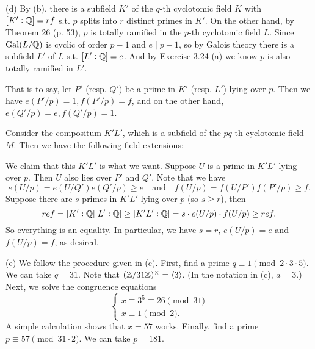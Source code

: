 \documentclass[../Marcus.tex]{subfiles}
\begin{document}
(d) By (b), there is a subfield $K'$ of the $q$-th cyclotomic field $K$ with $[K':\mathbb{Q}] = rf$ s.t. $p$ splits into $r$ distinct primes in $K'$. On the other hand, by Theorem 26 (p. 53), $p$ is totally ramified in the $p$-th cyclotomic field $L$. Since $\operatorname{Gal}(L/\mathbb{Q})$ is cyclic of order $p-1$ and $e \mid p-1$, so by Galois theory there is a subfield $L'$ of $L$ s.t. $[L':\mathbb{Q}]=e$. And by Exercise 3.24 (a) we know $p$ is also totally ramified in $L'$.

That is to say, let $P'$ (resp. $Q'$) be a prime in $K'$ (resp. $L'$) lying over $p$. Then we have $e(P'/p) = 1, f(P'/p) = f$, and on the other hand, $e(Q'/p) = e, f(Q'/p) = 1$.

Consider the compositum $K'L'$, which is a subfield of the $pq$-th cyclotomic field $M$. Then we have the following field extensions:
\begin{center}
\end{center}
We claim that this $K'L'$ is what we want. Suppose $U$ is a prime in $K'L'$ lying over $p$. Then $U$ also lies over $P'$ and $Q'$. Note that we have
$$
e(U/p) = e(U/Q')e(Q'/p) \geq e \quad \text{and} \quad f(U/p) = f(U/P')f(P'/p) \geq f.
$$
Suppose there are $s$ primes in $K'L'$ lying over $p$ (so $s\geq r$), then
$$
ref = [K' : \mathbb{Q}][L' : \mathbb{Q}] \geq [K'L' : \mathbb{Q}] = s \cdot e(U/p) \cdot f(U/p) \geq ref.
$$
So everything is an equality. In particular, we have $s=r$, $e(U/p) = e$ and $f(U/p) = f$, as desired.

(e) We follow the procedure given in (c). First, find a prime $q \equiv 1 \pmod{2\cdot3\cdot5}$. We can take $q=31$. Note that $(\mathbb{Z}/31\mathbb{Z})^\times = \langle3\rangle$. (In the notation in (c), $a=3$.) Next, we solve the congruence equations
$$
\begin{cases}
x \equiv 3^5 \equiv 26 \pmod{31} \\
x \equiv 1 \pmod{2}.
\end{cases}
$$
A simple calculation shows that $x=57$ works. Finally, find a prime $p \equiv 57 \pmod{31\cdot2}$. We can take $p=181$.
\end{document}
